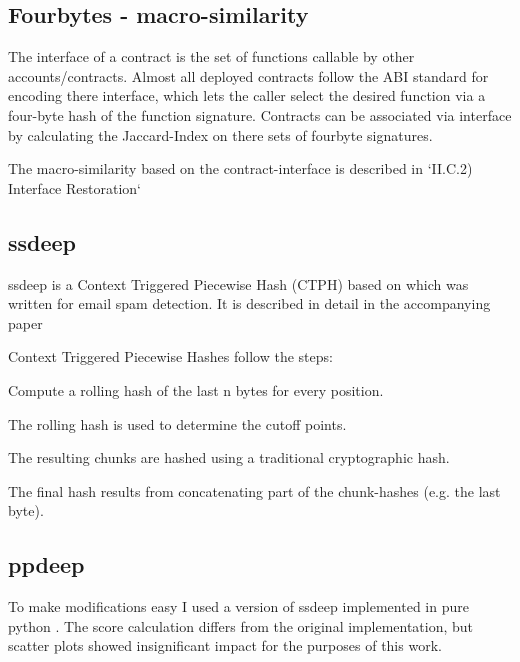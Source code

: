 \documentclass[../main.tex]{subfiles}
\begin{document}
\subsection{Fourbytes - macro-similarity}

The interface of a contract is the set of functions callable by other accounts/contracts.
Almost all deployed contracts follow the ABI standard for encoding there interface, which lets the caller select the desired function via a four-byte hash of the function signature.
Contracts can be associated via interface by calculating the Jaccard-Index on there sets of fourbyte signatures.

The macro-similarity based on the contract-interface is described in `II.C.2) Interface Restoration` 

\subsection{ssdeep}
ssdeep is a Context Triggered Piecewise Hash (CTPH) based on  which was written for email spam detection. It is described in detail in the accompanying paper 

Context Triggered Piecewise Hashes follow the steps:
\begin{ol}
  \item Compute a rolling hash of the last n bytes for every position.
  \item The rolling hash is used to determine the cutoff points.
  \item The resulting chunks are hashed using a traditional cryptographic hash.
  \item The final hash results from concatenating part of the chunk-hashes (e.g. the last byte).
\end{ol}

\subsection{ppdeep}
To make modifications easy I used a version of ssdeep implemented in pure python . The score calculation differs from the original implementation, but scatter plots  showed insignificant impact for the purposes of this work.
\end{document}
